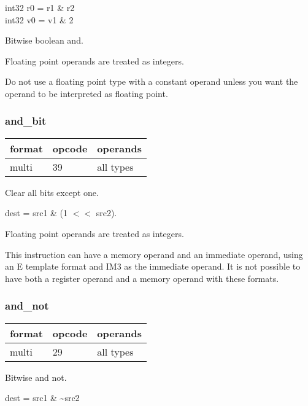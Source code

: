 \documentclass[forwardcom.tex]{subfiles}
\begin{document}
int32 r0 = r1 \& r2 \\
int32 v0 = v1 \& 2
\vspace{2mm}

Bitwise boolean and.
\vspace{2mm}

Floating point operands are treated as integers.

Do not use a floating point type with a constant operand unless you want the operand to be interpreted as floating point.

\subsubsection{and\_bit}
\label{table:andBitInstruction}
\begin{tabular}{|p{12mm}|p{12mm}|p{110mm}|}
\hline
\bfseries format & \bfseries opcode & \bfseries operands \\ \hline
multi & 39 & all types \\ \hline
\end{tabular}
\vspace{2mm}

Clear all bits except one. 
\vspace{2mm}

dest = src1 \& (1 $<<$ src2).

\vspace{2mm}
Floating point operands are treated as integers.

\vspace{2mm}
This instruction can have a memory operand and an immediate operand, using an E template format and IM3  as the immediate operand. It is not possible to have both a register operand and a memory operand with these formats.
\vspace{2mm}

\subsubsection{and\_not}
\label{table:andNotInstruction}
\begin{tabular}{|p{12mm}|p{12mm}|p{110mm}|}
\hline
\bfseries format & \bfseries opcode & \bfseries operands \\ \hline
multi & 29 & all types \\ \hline
\end{tabular}
\vspace{2mm}

Bitwise and not.

dest = src1 \& \~{}src2
\vspace{2mm}
\end{document}
